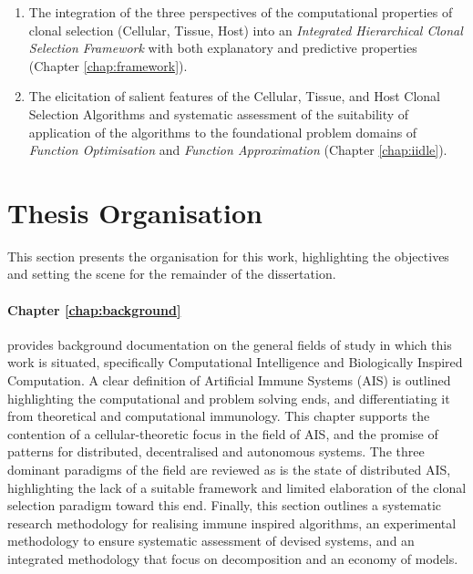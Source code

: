 \begin{enumerate}
	\item The integration of the three perspectives of the computational properties of clonal selection (Cellular, Tissue, Host) into an \emph{Integrated Hierarchical Clonal Selection Framework} with both explanatory and predictive properties (Chapter \ref{chap:framework}).

	\item The elicitation of salient features of the Cellular, Tissue, and Host Clonal Selection Algorithms and systematic assessment of the suitability of application of the algorithms to the foundational problem domains of \emph{Function Optimisation} and \emph{Function Approximation} (Chapter \ref{chap:iidle}).

\end{enumerate}




%
%
\section{Thesis Organisation}
\label{sec:intro:organisation} 
This section presents the organisation for this work, highlighting the objectives and setting the scene for the remainder of the dissertation.

\paragraph{Chapter \ref{chap:background}} provides background documentation on the general fields of study in which this work is situated, specifically Computational Intelligence and Biologically Inspired Computation. A clear definition of Artificial Immune Systems (AIS) is outlined highlighting the computational and problem solving ends, and differentiating it from theoretical and computational immunology. This chapter supports the contention of a cellular-theoretic focus in the field of AIS, and the promise of patterns for distributed, decentralised and autonomous systems. The three dominant paradigms of the field are reviewed as is the state of distributed AIS, highlighting the lack of a suitable framework and limited elaboration of the clonal selection paradigm toward this end. Finally, this section outlines a systematic research methodology for realising immune inspired algorithms, an experimental methodology to ensure systematic assessment of devised systems, and an integrated methodology that focus on decomposition and an economy of models.

